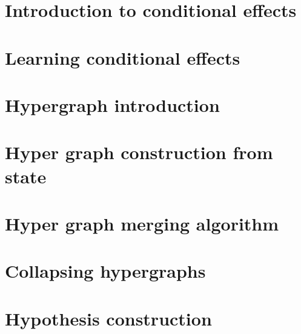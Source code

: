 \documentclass[Master.tex]{subfiles}
\begin{document}
\section{Introduction to conditional effects}
    

\section{Learning conditional effects}
    

\section{Hypergraph introduction}
    

\section{Hyper graph construction from state}
	

\section{Hyper graph merging algorithm}
    \label{sec:C:HGMerging}

\section{Collapsing hypergraphs}
	

\section{Hypothesis construction}
	
\end{document}
